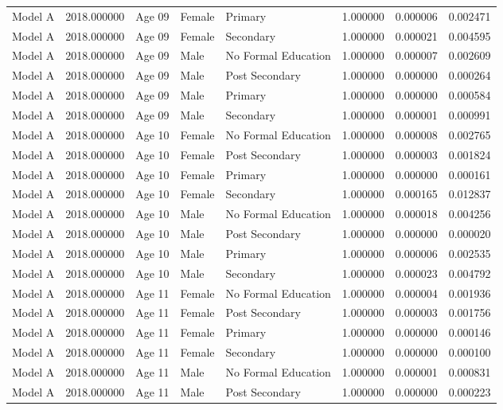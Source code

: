 \begin{table}[ht]
\begin{tabular}{lrlllrrr}
Model A & 2018.000000 & Age 09 & Female & Primary & 1.000000 & 0.000006 & 0.002471 \\
Model A & 2018.000000 & Age 09 & Female & Secondary & 1.000000 & 0.000021 & 0.004595 \\
Model A & 2018.000000 & Age 09 & Male & No Formal Education & 1.000000 & 0.000007 & 0.002609 \\
Model A & 2018.000000 & Age 09 & Male & Post Secondary & 1.000000 & 0.000000 & 0.000264 \\
Model A & 2018.000000 & Age 09 & Male & Primary & 1.000000 & 0.000000 & 0.000584 \\
Model A & 2018.000000 & Age 09 & Male & Secondary & 1.000000 & 0.000001 & 0.000991 \\
Model A & 2018.000000 & Age 10 & Female & No Formal Education & 1.000000 & 0.000008 & 0.002765 \\
Model A & 2018.000000 & Age 10 & Female & Post Secondary & 1.000000 & 0.000003 & 0.001824 \\
Model A & 2018.000000 & Age 10 & Female & Primary & 1.000000 & 0.000000 & 0.000161 \\
Model A & 2018.000000 & Age 10 & Female & Secondary & 1.000000 & 0.000165 & 0.012837 \\
Model A & 2018.000000 & Age 10 & Male & No Formal Education & 1.000000 & 0.000018 & 0.004256 \\
Model A & 2018.000000 & Age 10 & Male & Post Secondary & 1.000000 & 0.000000 & 0.000020 \\
Model A & 2018.000000 & Age 10 & Male & Primary & 1.000000 & 0.000006 & 0.002535 \\
Model A & 2018.000000 & Age 10 & Male & Secondary & 1.000000 & 0.000023 & 0.004792 \\
Model A & 2018.000000 & Age 11 & Female & No Formal Education & 1.000000 & 0.000004 & 0.001936 \\
Model A & 2018.000000 & Age 11 & Female & Post Secondary & 1.000000 & 0.000003 & 0.001756 \\
Model A & 2018.000000 & Age 11 & Female & Primary & 1.000000 & 0.000000 & 0.000146 \\
Model A & 2018.000000 & Age 11 & Female & Secondary & 1.000000 & 0.000000 & 0.000100 \\
Model A & 2018.000000 & Age 11 & Male & No Formal Education & 1.000000 & 0.000001 & 0.000831 \\
Model A & 2018.000000 & Age 11 & Male & Post Secondary & 1.000000 & 0.000000 & 0.000223 \\

\end{tabular}
\end{table}
